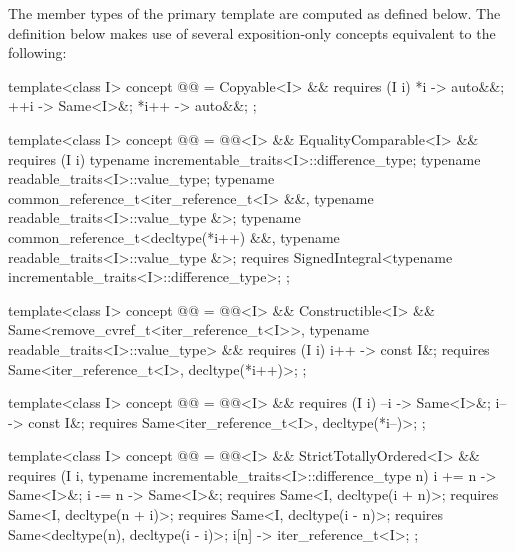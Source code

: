 {\color{newclr}
\pnum
The member types of the primary template are computed as defined below.
The definition below makes use of several exposition-only concepts equivalent
to the following:

\begin{codeblock}
template<class I>
concept @@ =
  Copyable<I> && requires (I i) {
    { *i } -> auto&&;
    { ++i } -> Same<I>&;
    { *i++ } -> auto&&;
  };

template<class I>
concept @@ =
  @@<I> && EqualityComparable<I> && requires (I i) {
    typename incrementable_traits<I>::difference_type;
    typename readable_traits<I>::value_type;
    typename common_reference_t<iter_reference_t<I> &&,
                                typename readable_traits<I>::value_type &>;
    typename common_reference_t<decltype(*i++) &&,
                                typename readable_traits<I>::value_type &>;
    requires SignedIntegral<typename incrementable_traits<I>::difference_type>;
  };

template<class I>
concept @@ =
  @@<I> && Constructible<I> &&
  Same<remove_cvref_t<iter_reference_t<I>>, typename readable_traits<I>::value_type> &&
  requires (I i) {
    { i++ } -> const I&;
    requires Same<iter_reference_t<I>, decltype(*i++)>;
  };

template<class I>
concept @@ =
  @@<I> && requires (I i) {
    { --i } -> Same<I>&;
    { i-- } -> const I&;
    requires Same<iter_reference_t<I>, decltype(*i--)>;
  };

template<class I>
concept @@ =
  @@<I> && StrictTotallyOrdered<I> &&
  requires (I i, typename incrementable_traits<I>::difference_type n) {
    { i += n } -> Same<I>&;
    { i -= n } -> Same<I>&;
    requires Same<I, decltype(i + n)>;
    requires Same<I, decltype(n + i)>;
    requires Same<I, decltype(i - n)>;
    requires Same<decltype(n), decltype(i - i)>;
    { i[n] } -> iter_reference_t<I>;
  };
\end{codeblock}
} %

